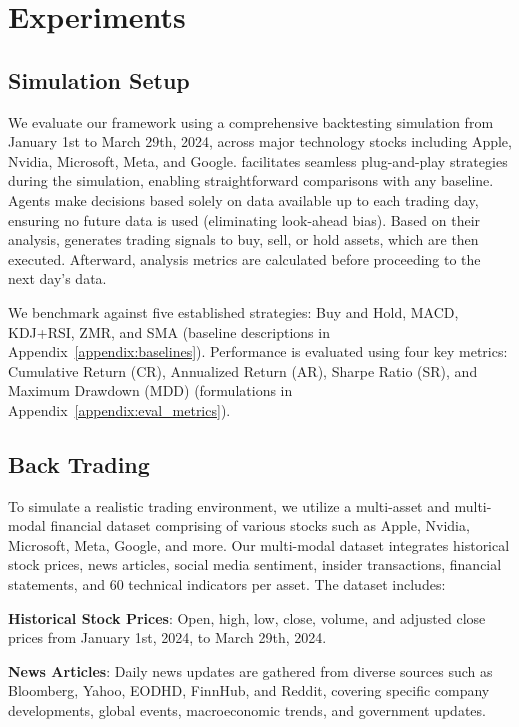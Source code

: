 \section{Experiments}


\subsection{Simulation Setup}
We evaluate our \model framework using a comprehensive backtesting simulation from January 1st to March 29th, 2024, across major technology stocks including Apple, Nvidia, Microsoft, Meta, and Google. \model facilitates seamless plug-and-play strategies during the simulation, enabling straightforward comparisons with any baseline. Agents make decisions based solely on data available up to each trading day, ensuring no future data is used (eliminating look-ahead bias). Based on their analysis, \model generates trading signals to buy, sell, or hold assets, which are then executed. Afterward, analysis metrics are calculated before proceeding to the next day's data.

We benchmark against five established strategies: Buy and Hold, MACD, KDJ+RSI, ZMR, and SMA (baseline descriptions in Appendix~\ref{appendix:baselines}). Performance is evaluated using four key metrics: Cumulative Return (CR), Annualized Return (AR), Sharpe Ratio (SR), and Maximum Drawdown (MDD) (formulations in Appendix~\ref{appendix:eval_metrics}).

\subsection{Back Trading}
To simulate a realistic trading environment, we utilize a multi-asset and multi-modal financial dataset comprising of various stocks such as Apple, Nvidia, Microsoft, Meta, Google, and more. Our multi-modal dataset integrates historical stock prices, news articles, social media sentiment, insider transactions, financial statements, and 60 technical indicators per asset. The dataset includes:

\textbf{Historical Stock Prices}: Open, high, low, close, volume, and adjusted close prices from January 1st, 2024, to March 29th, 2024.

\textbf{News Articles}: Daily news updates are gathered from diverse sources such as Bloomberg, Yahoo, EODHD, FinnHub, and Reddit, covering specific company developments, global events, macroeconomic trends, and government updates.

